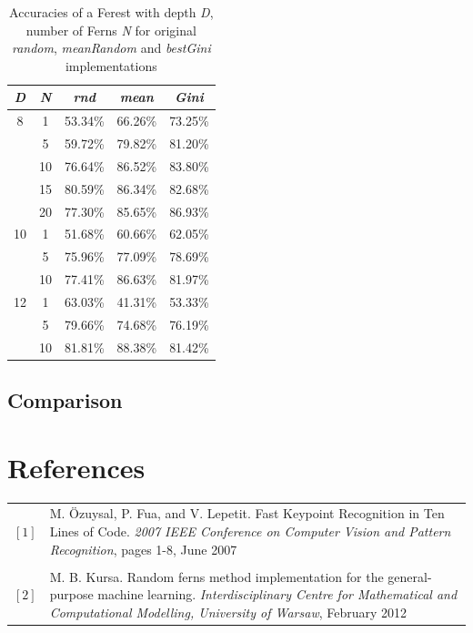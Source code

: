 \documentclass[twocolumn]{article}
\begin{document}
\begin{table}
\begin{tabular}{c|c||c|c|c}
\textit{D} & \textit{N} & \textit{rnd} & \textit{mean} & \textit{Gini}\\
\hline
\hline
8 	& 1 	& 53.34\% 	& 66.26\% 	& 73.25\% \\
 	& 5 	& 59.72\% 	& 79.82\%	& 81.20\% \\
 	& 10 	& 76.64\% 	& 86.52\%	& 83.80\% \\
 	& 15 	& 80.59\% 	& 86.34\%	& 82.68\% \\
 	& 20 	& 77.30\% 	& 85.65\%	& 86.93\% \\
\hline
10 	& 1 	& 51.68\% 	& 60.66\%	& 62.05\% \\
 	& 5 	& 75.96\% 	& 77.09\%	& 78.69\% \\
 	& 10 	& 77.41\% 	& 86.63\%	& 81.97\% \\
\hline
12 	& 1 	& 63.03\% 	& 41.31\%	& 53.33\% \\
 	& 5 	& 79.66\% 	& 74.68\%	& 76.19\% \\
 	& 10 	& 81.81\% 	& 88.38\%	& 81.42\% 
\end{tabular}
\caption{Accuracies of a Ferest with depth \textit{D}, number of Ferns \textit{N} for original \textit{random}, \textit{meanRandom} and \textit{bestGini} implementations}
\label{ferest_versions}
\end{table}

\subsection{Comparison}


\onecolumn
\section*{References}

\begin{tabular}{p{1cm}p{11cm}}

$[1]$ & M. \"Ozuysal, P. Fua, and V. Lepetit. Fast Keypoint Recognition in Ten Lines of Code. \textit{2007 IEEE Conference on Computer Vision and Pattern Recognition}, pages 1-8, June 2007\\
 & \\
$[2]$ & M. B. Kursa. Random ferns method implementation for the general-purpose machine learning. \textit{Interdisciplinary Centre for Mathematical and Computational Modelling, University of Warsaw}, February 2012

\end{tabular}
\end{document}
